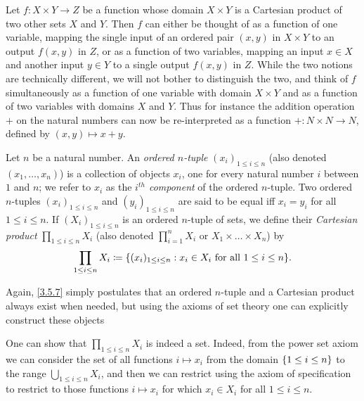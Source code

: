 \begin{note}
	Let \(f : X \times Y \to Z\) be a function whose domain \(X \times Y\) is a Cartesian product of two other sets \(X\) and \(Y\).
	Then \(f\) can either be thought of as a function of one variable, mapping the single input of an ordered pair \((x, y)\) in \(X \times Y\) to an output \(f(x, y)\) in \(Z\), or as a function of two variables, mapping an input \(x \in X\) and another input \(y \in Y\) to a single output \(f(x, y)\) in \(Z\).
	While the two notions are technically different, we will not bother to distinguish the two, and think of \(f\) simultaneously as a function of one variable with domain \(X \times Y\) and as a function of two variables with domains \(X\) and \(Y\).
	Thus for instance the addition operation \(+\) on the natural numbers can now be re-interpreted as a function \(+ : N \times N \to N\), defined by \((x, y) \mapsto x + y\).
\end{note}

\setcounter{thm}{6}
\begin{defn}\label{3.5.7}
	Let \(n\) be a natural number.
	An \emph{ordered \(n\)-tuple} \((x_i)_{1 \leq i \leq n}\) (also denoted \((x_1, \dots, x_n)\)) is a collection of objects \(x_i\), one for every natural number \(i\) between \(1\) and \(n\);
	we refer to \(x_i\) as the \emph{\(i^{th}\) component} of the ordered \(n\)-tuple.
	Two ordered \(n\)-tuples \((x_i)_{1 \leq i \leq n}\) and \((y_i)_{1 \leq i \leq n}\) are said to be equal iff \(x_i = y_i\) for all \(1 \leq i \leq n\).
	If \((X_i)_{1 \leq i \leq n}\) is an ordered \(n\)-tuple of sets, we define their \emph{Cartesian product} \(\prod_{1 \leq i \leq n} X_i\) (also denoted \(\prod_{i=1}^n X_i\) or \(X_1 \times \dots \times X_n\)) by
	\[
		\prod_{1 \leq i \leq n} X_i \coloneqq \set{(x_i)_{1 \leq i \leq n} : x_i \in X_i \text{ for all } 1 \leq i \leq n}.
	\]
\end{defn}

\begin{note}
	Again, \cref{3.5.7} simply postulates that an ordered \(n\)-tuple and a Cartesian product always exist when needed, but using the axioms of set theory one can explicitly construct these objects
\end{note}

\begin{rmk}\label{3.5.8}
	One can show that \(\prod_{1 \leq i \leq n} X_i\) is indeed a set.
	Indeed, from the power set axiom we can consider the set of all functions \(i \mapsto x_i\) from the domain \(\left\lbrace1 \leq i \leq n\right\rbrace\) to the range \(\bigcup_{1 \leq i \leq n} X_i\), and then we can restrict using the axiom of specification to restrict to those functions \(i \mapsto x_i\) for which \(x_i \in X_i\) for all \(1 \leq i \leq n\).
\end{rmk}

